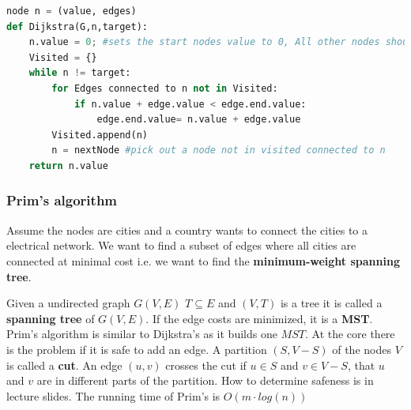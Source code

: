 \documentclass[12pt]{article} %
\begin{document}
\begin{lstlisting}[language=Python, caption=Dijkstra's in pseudo/Python]
node n = (value, edges)
def Dijkstra(G,n,target):
    n.value = 0; #sets the start nodes value to 0, All other nodes should have inf as value. 
    Visited = {}
    while n != target:
        for Edges connected to n not in Visited:
            if n.value + edge.value < edge.end.value:
                edge.end.value= n.value + edge.value
        Visited.append(n)
        n = nextNode #pick out a node not in visited connected to n
    return n.value
\end{lstlisting}

\subsubsection{Prim's algorithm}
Assume the nodes are cities and a country wants to connect the cities to a electrical network. We want to find a subset of edges where all cities are connected at minimal cost i.e. we want to find the \textbf{minimum-weight spanning tree}.
\par Given a undirected graph $G(V,E)$ $T \subseteq E$ and $(V, T)$ is a tree it is called a \textbf{spanning tree} of $G(V, E)$. If the edge costs are minimized, it is a \textbf{MST}. Prim's algorithm is similar to Dijkstra's as it builds one $MST$. At the core there is the problem if it is safe to add an edge. A partition $(S, V - S)$ of the nodes $V$ is called a \textbf{cut}. An edge $(u, v)$ crosses the cut if $u \in S$ and $v \in V - S$, that $u$ and $v$ are in different parts of the partition. How to determine safeness is in lecture slides. The running time of Prim's is $O(m \cdot log(n))$
\end{document}
